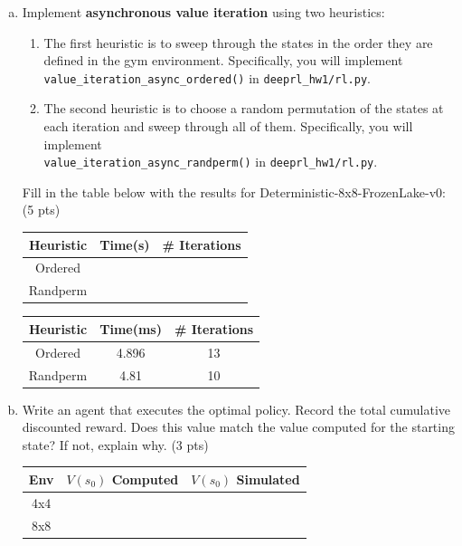 \documentclass[12pt]{article}
\begin{document}
\begin{enumerate}[a)]
\item Implement \textbf{asynchronous value iteration} using two heuristics:
\begin{enumerate}[1.]
\item The first heuristic is to sweep through the states in the order they are defined in the gym environment. Specifically, you will implement\\
\texttt{value\_iteration\_async\_ordered()} in \texttt{deeprl\_hw1/rl.py}.
\item The second heuristic is to choose a random permutation of the states at each iteration and sweep through all of them.  Specifically, you will implement\\
\texttt{value\_iteration\_async\_randperm()} in \texttt{deeprl\_hw1/rl.py}.
\end{enumerate}
Fill in the table below with the results for Deterministic-8x8-FrozenLake-v0: (5 pts)

\begin{center}
  \begin{tabular}{|c|c|c|}\hline
    {\bf Heuristic} & {\bf Time(s)} & {\bf \# Iterations} \\ \hline
    Ordered & & \\ \hline
    Randperm & & \\ \hline
  \end{tabular}
\end{center}

\begin{solution}
\begin{center}
  \begin{tabular}{|c|c|c|}\hline
    {\bf Heuristic} & {\bf Time(ms)} & {\bf \# Iterations} \\ \hline
    Ordered & 4.896 & 13 \\ \hline
    Randperm & 4.81 & 10 \\ \hline
  \end{tabular}
\end{center}
\end{solution}

\item Write an agent that executes the optimal policy. Record the total cumulative discounted reward. Does this value match the value computed for the starting state? If not, explain why. (3 pts)

\begin{center}
  \begin{tabular}{|c|c|c|}\hline
    {\bf Env} & {\bf $V(s_0)$ Computed} & {\bf $V(s_0)$ Simulated}  \\ \hline
    4x4  & & \\ \hline
    8x8  & & \\ \hline
  \end{tabular}
\end{center}


\end{enumerate}
\end{document}
